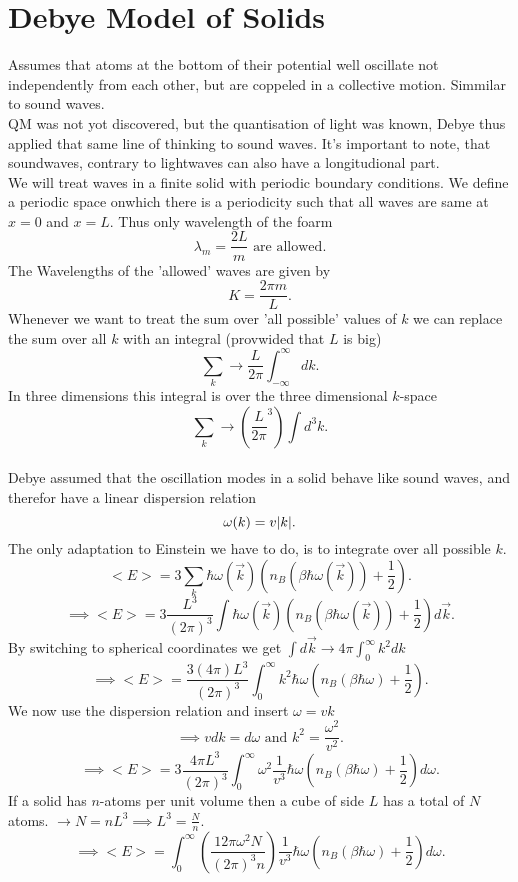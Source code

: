\documentclass{report}
\begin{document}
\section{Debye Model of Solids}
Assumes that atoms at the bottom of their potential well oscillate not independently from each other, but are coppeled in a collective motion. Simmilar to sound waves. \\
QM was not yot discovered, but the quantisation of light was known, Debye thus applied that same line of thinking to sound waves. It's important to note, that soundwaves, contrary to lightwaves can also have a longitudional part.\\
We will treat waves in a finite solid with periodic boundary conditions. We define a periodic space onwhich there is a periodicity such that all waves are same at $x=0$ and $x=L$. Thus only wavelength of the foarm \[
\lambda_m = \frac{2L}{m} \text{ are allowed}
.\] The Wavelengths of the 'allowed' waves are given by \[
K = \frac{2\pi m}{L}
.\] Whenever we want to treat the sum over 'all possible' values of $k$ we can replace the sum over all $k$ with an integral (provwided that $L$ is big) \[
\sum_{k} \to \frac{L}{2\pi} \int_{-\infty}^{\infty}dk
.\] In three dimensions this integral is over the three dimensional $k$-space \[
\sum_{k} \to \left( \frac{L}{2\pi}^3 \right) \int d^3k
.\] \\
Debye assumed that the oscillation modes in a solid behave like sound waves, and therefor have a linear dispersion relation \[
	\omega(k) = v \abs{k}
.\] The only adaptation to Einstein we have to do, is to integrate over all possible $k$.
\[
	<E> = 3 \sum_{k} \hbar \omega(\vec{k}) \left( n_B(\beta \hbar \omega(\vec{k})) + \frac{1}{2} \right) 
.\] \[
\implies <E> = 3 \frac{L^3}{\left( 2\pi \right) ^3} \int \hbar \omega(\vec{k}) \left( n_B(\beta \hbar \omega(\vec{k})) + \frac{1}{2} \right) d\vec{k}
.\] By switching to spherical coordinates we get $\int d\vec{k} \to 4\pi \int_0^{\infty} k^2 dk$ \[
\implies <E> = \frac{3(4\pi)L^3}{(2\pi)^3} \int_0^{\infty} k^2 \hbar \omega \left( n_B(\beta \hbar \omega) +\frac{1}{2} \right) 
.\] We now use the dispersion relation and insert $\omega = vk$ \[
\implies v dk = d\omega \text{ and } k^2 = \frac{\omega^2}{v^2}
.\] \[
\implies <E> = 3 \frac{4 \pi L^3}{(2\pi)^3} \int_0^{\infty} \omega^2 \frac{1}{v^3} \hbar \omega \left( n_B(\beta \hbar \omega) + \frac{1}{2} \right) d\omega
.\] If a solid has $n$-atoms per unit volume then a cube of side $L$ has a total of $N$ atoms. $\to N = n L^3 \implies L^3 = \frac{N}{n}$. \[
\implies <E> = \int_0^{\infty} \left( \frac{12 \pi \omega^2 N}{ (2 \pi)^3 n} \right) \frac{1}{v^3} \hbar \omega \left( n_B(\beta \hbar \omega) + \frac{1}{2} \right) d\omega 
.\] 
\end{document}
